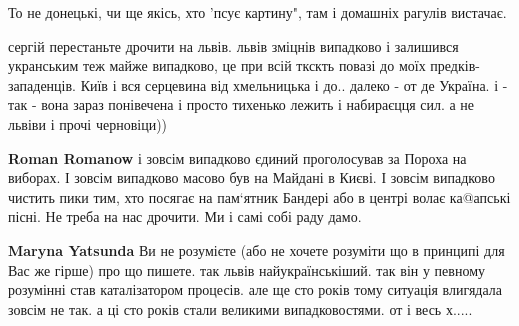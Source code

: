 \begin{itemize}
\begin{itemize}
\end{itemize}

 
То не донецькі, чи ще якісь, хто 'псує картину", там і домашніх рагулів вистачає.

 

сергій перестаньте дрочити на львів. львів зміцнів випадково і залишився
укранським теж майже випадково, це при всій ткскть повазі до моїх
предків-западенців. Київ і вся серцевина від хмельницька і до.. далеко - от де
Україна. і - так - вона зараз понівечена і просто тихенько лежить і набираєцця
сил. а не львіви і прочі черновіци))

\begin{itemize}
 
\textbf{Roman Romanow} і зовсім випадково єдиний проголосував за Пороха на виборах. І зовсім випадково масово був на Майдані в Києві. І зовсім випадково чистить пики тим, хто посягає на пам‘ятник Бандері або в центрі волає ка@апські пісні. Не треба на нас дрочити. Ми і самі собі раду дамо.

 
\textbf{Maryna Yatsunda} Ви не розумієте (або не хочете розуміти що в принципі для Вас же гірше) про що пишете. так львів найукраїнськіший. так він у певному розумінні став каталізатором процесів. але ще сто років тому ситуація влигядала зовсім не так. а ці сто років стали великими випадковостями. от і весь х.....

 

\end{itemize}
\end{itemize}
